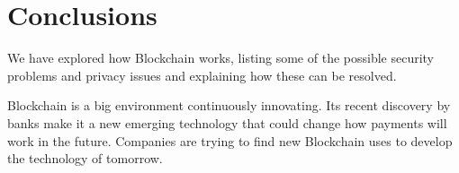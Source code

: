 \section*{Conclusions}

We have explored how Blockchain works, listing some of the possible security
problems and privacy issues and explaining how these can be resolved.

Blockchain is a big environment continuously innovating. Its recent discovery by
banks make it a new emerging technology that could change how payments will work
in the future. Companies are trying to find new Blockchain uses to develop
the technology of tomorrow.
